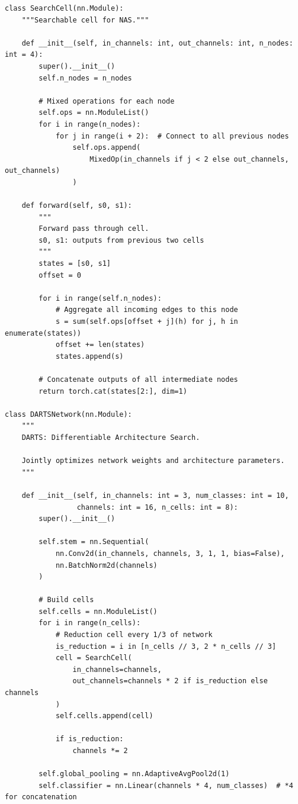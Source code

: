 \begin{lstlisting}[style=python, caption=Neural Architecture Search with DARTS]
class SearchCell(nn.Module):
    """Searchable cell for NAS."""

    def __init__(self, in_channels: int, out_channels: int, n_nodes: int = 4):
        super().__init__()
        self.n_nodes = n_nodes

        # Mixed operations for each node
        self.ops = nn.ModuleList()
        for i in range(n_nodes):
            for j in range(i + 2):  # Connect to all previous nodes
                self.ops.append(
                    MixedOp(in_channels if j < 2 else out_channels, out_channels)
                )

    def forward(self, s0, s1):
        """
        Forward pass through cell.
        s0, s1: outputs from previous two cells
        """
        states = [s0, s1]
        offset = 0

        for i in range(self.n_nodes):
            # Aggregate all incoming edges to this node
            s = sum(self.ops[offset + j](h) for j, h in enumerate(states))
            offset += len(states)
            states.append(s)

        # Concatenate outputs of all intermediate nodes
        return torch.cat(states[2:], dim=1)

class DARTSNetwork(nn.Module):
    """
    DARTS: Differentiable Architecture Search.

    Jointly optimizes network weights and architecture parameters.
    """

    def __init__(self, in_channels: int = 3, num_classes: int = 10,
                 channels: int = 16, n_cells: int = 8):
        super().__init__()

        self.stem = nn.Sequential(
            nn.Conv2d(in_channels, channels, 3, 1, 1, bias=False),
            nn.BatchNorm2d(channels)
        )

        # Build cells
        self.cells = nn.ModuleList()
        for i in range(n_cells):
            # Reduction cell every 1/3 of network
            is_reduction = i in [n_cells // 3, 2 * n_cells // 3]
            cell = SearchCell(
                in_channels=channels,
                out_channels=channels * 2 if is_reduction else channels
            )
            self.cells.append(cell)

            if is_reduction:
                channels *= 2

        self.global_pooling = nn.AdaptiveAvgPool2d(1)
        self.classifier = nn.Linear(channels * 4, num_classes)  # *4 for concatenation


\end{lstlisting}
